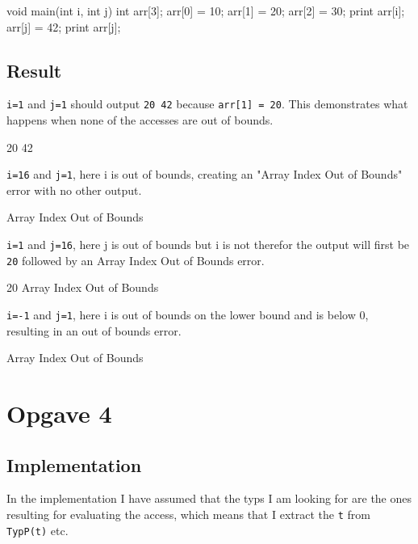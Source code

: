 \begin{ccode}
void main(int i, int j) {
    int arr[3];
    arr[0] = 10;
    arr[1] = 20;
    arr[2] = 30;
    print arr[i];
    arr[j] = 42;
    print arr[j];
}
\end{ccode}
\subsection{Result}
\texttt{i=1} and \texttt{j=1} should output \texttt{20 42} because
\texttt{arr[1] = 20}. This demonstrates what happens when none of the accesses
are out of bounds.
\begin{bashcode}
20 42 
\end{bashcode}
\texttt{i=16} and \texttt{j=1}, here i is out of bounds, creating an "Array
Index Out of Bounds" error with no other output.
\begin{bashcode}
Array Index Out of Bounds
\end{bashcode}
\texttt{i=1} and \texttt{j=16}, here j is out of bounds but i is not therefor the output will
first be \texttt{20} followed by an Array Index Out of Bounds error.
\begin{bashcode}
20 Array Index Out of Bounds
\end{bashcode}

\texttt{i=-1} and \texttt{j=1}, here i is out of bounds on the lower bound and
is below 0, resulting in an out of bounds error.
\begin{bashcode}
Array Index Out of Bounds
\end{bashcode}

\section{Opgave 4}
\subsection{Implementation}
In the implementation I have assumed that the typs I am looking for are the
ones resulting for evaluating the access, which means that I extract the
\texttt{t} from \texttt{TypP(t)} etc.

